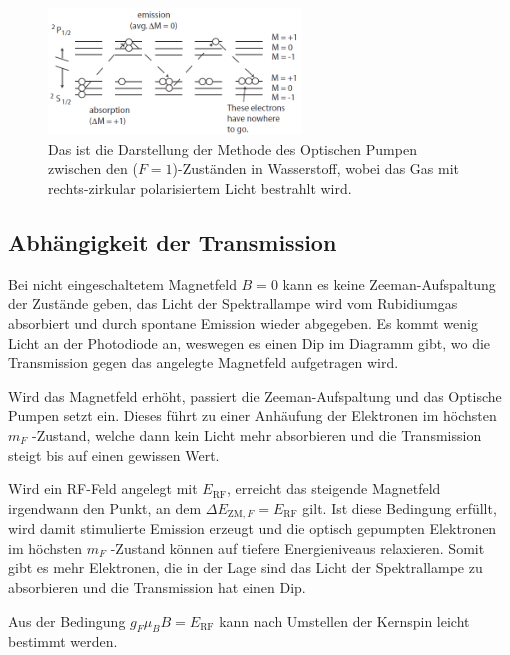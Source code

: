         \begin{figure}
            \centering
            \includegraphics[width = 0.6\textwidth]{pictures/OptischesPumpen.png}
            \caption{Das ist die Darstellung der Methode des Optischen Pumpen zwischen den ($F=1$)-Zuständen in Wasserstoff, wobei das Gas mit rechts-zirkular polarisiertem Licht bestrahlt wird.}
            \label{fig:OptischesPumpen}
        \end{figure}

        \FloatBarrier

    \subsection{Abhängigkeit der Transmission}
        Bei nicht eingeschaltetem Magnetfeld $B = 0$ kann es keine Zeeman-Aufspaltung der Zustände geben, das Licht der Spektrallampe wird vom Rubidiumgas absorbiert und durch spontane Emission wieder abgegeben. Es kommt wenig Licht an der Photodiode an, weswegen es einen Dip im Diagramm gibt, wo die Transmission gegen das angelegte Magnetfeld aufgetragen wird.

        Wird das Magnetfeld erhöht, passiert die Zeeman-Aufspaltung und das Optische Pumpen setzt ein. Dieses führt zu einer Anhäufung der Elektronen im höchsten $m_F$ -Zustand, welche dann kein Licht mehr absorbieren und die Transmission steigt bis auf einen gewissen Wert.

        Wird ein RF-Feld angelegt mit $E_{\text{RF}}$, erreicht das steigende Magnetfeld irgendwann den Punkt, an dem $\Delta E_{\text{ZM},F} = E_{\text{RF}}$ gilt. Ist diese Bedingung erfüllt, wird damit stimulierte Emission erzeugt und die optisch gepumpten Elektronen im höchsten $m_F$ -Zustand können auf tiefere Energieniveaus relaxieren. Somit gibt es mehr Elektronen, die in der Lage sind das Licht der Spektrallampe zu absorbieren und die Transmission hat einen Dip.

        Aus der Bedingung $g_F \mu_B B = E_{\text{RF}}$ kann nach Umstellen der Kernspin leicht bestimmt werden.